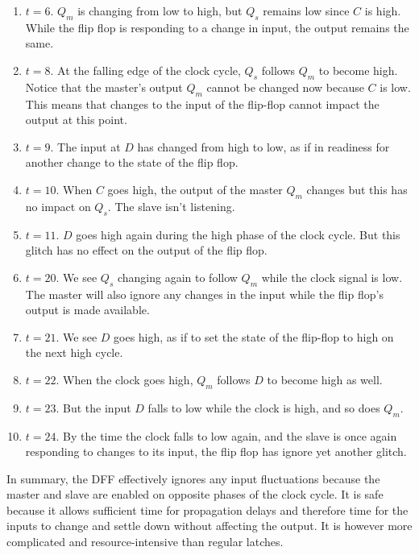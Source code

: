 \begin{example}
    \begin{enumerate}
      \item $t = 6$. $Q_m$ is changing from low to high, but $Q_s$ remains low since $C$ is high. While the flip flop is responding to a change in input, the output remains the same. 
      \item $t = 8$. At the falling edge of the clock cycle, $Q_s$ follows $Q_m$ to become high. Notice that the master's output $Q_m$ cannot be changed now because $C$ is low. This means that changes to the input of the flip-flop cannot impact the output at this point. 
      \item $t = 9$. The input at $D$ has changed from high to low, as if in readiness for another change to the state of the flip flop. 
      \item $t = 10$. When $C$ goes high, the output of the master $Q_m$ changes but this has no impact on $Q_s$. The slave isn't listening. 
      \item $t = 11$. $D$ goes high again during the high phase of the clock cycle. But this glitch has no effect on the output of the flip flop. 
      \item $t = 20$. We see $Q_s$ changing again to follow $Q_m$ while the clock signal is low. The master will also ignore any changes in the input while the flip flop's output is made available. 
      \item $t = 21$. We see $D$ goes high, as if to set the state of the flip-flop to high on the next high cycle. 
      \item $t = 22$. When the clock goes high, $Q_m$ follows $D$ to become high as well. 
      \item $t = 23$. But the input $D$ falls to low while the clock is high, and so does $Q_m$. 
      \item $t = 24$. By the time the clock falls to low again, and the slave is once again responding to changes to its input, the flip flop has ignore yet another glitch. 
    \end{enumerate}

    In summary, the DFF effectively ignores any input fluctuations because the master and slave are enabled on opposite phases of the clock cycle. It is safe because it allows sufficient time for propagation delays and therefore time for the inputs to change and settle down without affecting the output. It is however more complicated and resource-intensive than regular latches. 

    \begin{figure}[H]
      \centering 
\end{figure}
\end{example}
